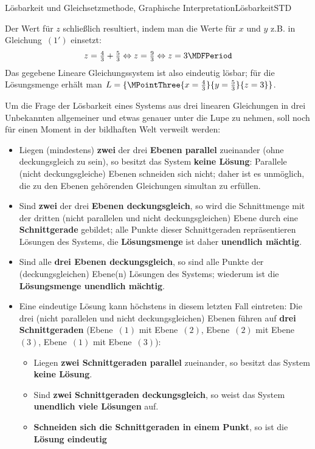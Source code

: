 \begin{MXContent}{Lösbarkeit und Gleichsetzmethode, Graphische Interpretation}{Lösbarkeit}{STD}
\begin{MExample}
\begin{center}
{\begin{tikzpicture}[x=1.0cm, y=1.0cm]
\end{tikzpicture}
}%
\end{center}
Der Wert für $z$ schließlich resultiert, indem man die Werte für $x$ und $y$ z.B. in Gleichung~$(1')$ einsetzt:
$$z = \Mtfrac43 + \Mtfrac53 \Leftrightarrow z = \Mtfrac93 \Leftrightarrow z = 3 \MDFPeriod $$
Das gegebene Lineare Gleichungssystem ist also eindeutig lösbar; für die Lösungsmenge erhält man
${\ML} = \{ \MPointThree{x = \Mtfrac43}{y = \Mtfrac53}{z = 3} \}$.
\end{MExample}
Um die Frage der Lösbarkeit eines Systems aus drei linearen Gleichungen in
drei Unbekannten allgemeiner und etwas genauer unter die Lupe zu nehmen,
soll noch für einen Moment in der bildhaften Welt verweilt werden:
\begin{itemize}
\item{Liegen (mindestens) \textbf{zwei} der drei \textbf{Ebenen parallel} zueinander (ohne deckungsgleich zu sein),
so besitzt das System \textbf{keine Lösung}: Parallele (nicht deckungsgleiche) Ebenen schneiden sich nicht;
daher ist es unmöglich, die zu den Ebenen gehörenden Gleichungen simultan zu erfüllen.}
\item{Sind \textbf{zwei} der drei \textbf{Ebenen deckungsgleich}, so wird die Schnittmenge mit der dritten (nicht
parallelen und nicht deckungsgleichen) Ebene durch eine \textbf{Schnittgerade} gebildet; alle Punkte dieser
Schnittgeraden repräsentieren Lösungen des Systems, die \textbf{Lösungsmenge} ist daher \textbf{unendlich mächtig}.}
\item{Sind alle \textbf{drei Ebenen deckungsgleich}, so sind alle Punkte der (deckungsgleichen) Ebene(n) Lösungen des Systems;
wiederum ist die \textbf{Lösungsmenge unendlich mächtig}.}
\item{Eine eindeutige Lösung kann höchstens in diesem letzten Fall eintreten: Die drei (nicht parallelen und nicht
deckungsgleichen) Ebenen führen auf \textbf{drei Schnittgeraden} (Ebene~$(1)$ mit Ebene~$(2)$, Ebene~$(2)$ mit Ebene~$(3)$,
Ebene~$(1)$ mit Ebene~$(3)$):
\begin{itemize}
\item{Liegen \textbf{zwei Schnittgeraden parallel} zueinander, so besitzt das System \textbf{keine Lösung}.}
\item{Sind \textbf{zwei Schnittgeraden deckungsgleich}, so weist das System \textbf{unendlich viele Lö\-sun\-gen} auf.}
\item{\textbf{Schneiden sich die Schnittgeraden in einem Punkt}, so ist die \textbf{Lösung eindeutig}
}
\end{itemize}}
\end{itemize}
\end{MXContent}
